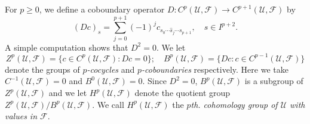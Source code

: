 For $p\geq0$, we define a coboundary operator $D:C^p(\mathcal U,\mathcal F)\to C^{p+1}(\mathcal U,\mathcal F)$ by
\[
(Dc)_s=\sum_{j=0}^{p+1}(-1)^j c_{s_0\cdots\widehat s_j\cdots s_{p+1}},\quad s\in I^{p+2}.
\]
A simple computation shows that $D^2=0$. We let
\[
Z^p(\mathcal U,\mathcal F)=\{c\in C^p(\mathcal U,\mathcal F):Dc=0\};\quad B^p(\mathcal U,\mathcal F)=\{Dc:c\in C^{p-1}(\mathcal U,\mathcal F)\}
\]
denote the groups of \emph{$p$-cocycles} and \emph{$p$-coboundaries} respectively. Here we take $C^{-1}(\mathcal U,\mathcal F)=0$ and $B^0(\mathcal U,\mathcal F)=0$. Since $D^2=0$, $B^p(\mathcal U,\mathcal F)$ is a subgroup of $Z^p(\mathcal U,\mathcal F)$ and we let $H^p(\mathcal U,\mathcal F)$ denote the quotient group $Z^p(\mathcal U,\mathcal F)/B^p(\mathcal U,\mathcal F)$. We call $H^p(\mathcal U,\mathcal F)$ the \emph{$p$th. cohomology group of $\mathcal U$ with values in $\mathcal F$}.
